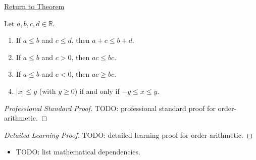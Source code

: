 \newpage
{}
\label{prf:order-arithmetic}

\begin{remark*}[Return]
\hyperref[prop:order-arithmetic]{Return to Theorem}
\end{remark*}

\begin{theorem*}
Let $a,b,c,d\in\mathbb{R}$.
\begin{enumerate}[label=(\roman*)]
  \item If $a\leq b$ and $c\leq d$, then $a+c\leq b+d$.
  \item If $a\leq b$ and $c>0$, then $ac\leq bc$.
  \item If $a\leq b$ and $c<0$, then $ac\geq bc$.
  \item $|x|\leq y$ (with $y\geq 0$) if and only if $-y\leq x\leq y$.
\end{enumerate}
\end{theorem*}

\begin{proof}[Professional Standard Proof]
\LRAProofBodyStart
TODO: professional standard proof for order-arithmetic.
\end{proof}

\begin{proof}[Detailed Learning Proof]
\LRAProofBodyStart
TODO: detailed learning proof for order-arithmetic.
\end{proof}

\begin{remark*}
\end{remark*}

\begin{dependencies}
\begin{itemize}
  \item TODO: list mathematical dependencies.
\end{itemize}
\end{dependencies}

\clearpage
